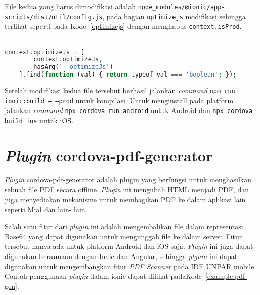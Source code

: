 File kedua yang harus dimodifikasi adalah \texttt{node\_modules/@ionic/app-scripts/dist/util/config.js}, pada bagian \texttt{optimizejs} modifikasi sehingga terlihat seperti pada \mbox{Kode \ref{optimizejs}} dengan menghapus \texttt{context.isProd}.
\\
\\

\begin{lstlisting}[frame=single, label={optimizejs}, language=PHP, caption= \texttt{optimizejs} setelah modifikasi]
context.optimizeJs = [
        context.optimizeJs,
        hasArg('--optimizeJs')
    ].find(function (val) { return typeof val === 'boolean'; });
\end{lstlisting}
Setelah modifikasi kedua file tersebut berhasil jalankan \textit{command} \texttt{npm run ionic:build -- --prod} untuk kompilasi. Untuk menginstall pada platform jalankan \textit{command} \texttt{npx cordova run android} untuk Android dan \texttt{npx cordova build ios} untuk iOS.


\section{\textit{Plugin} cordova-pdf-generator}
\label{pdf-gen}
\textit{Plugin} cordova-pdf-generator adalah plugin yang berfungsi untuk menghasilkan sebuah file PDF secara offline. \textit{Plugin} ini mengubah HTML menjadi PDF, dan juga menyediakan mekanisme untuk membagikan PDF ke dalam aplikasi lain seperti Mial dan lain-
lain.\cite{cordova-pdf-generator}

Salah satu fitur dari \textit{plugin} ini adalah mengembalikan file dalam representasi Base64 yang dapat digunakan untuk mengunggah file ke dalam server. Fitur tersebut hanya ada untuk platform Android dan iOS saja. \textit{Plugin} ini juga dapat digunakan bersamaan dengan Ionic dan Angular, sehingga \textit{plguin} ini dapat digunakan untuk mengembangkan fitur \textit{PDF Scanner} pada IDE UNPAR mobile. Contoh penggunaan \textit{plugin} dalam ionic dapat dilihat pada\mbox{Kode \ref{example:pdf-gen}}.

